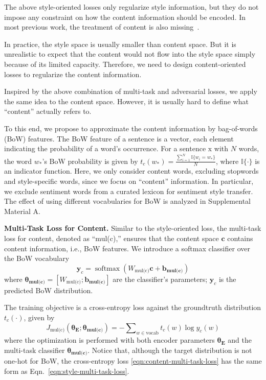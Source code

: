 \documentclass[11pt,a4paper]{article}
\newcommand{\rmx}{\mathrm x}
\newcommand{\loss}[1]{J_{\text{#1}}}
\newcommand{\nnweight}[1]{\bm{\theta_{\text{#1}}}}
\newcommand{\weight}[1]{W_{\text{#1}}}
\newcommand{\bias}[1]{\bm{b_{\text{#1}}}}
\begin{document}
The above style-oriented losses only regularize style information, but they do not impose any constraint on how the content information should be encoded. In most previous work, the treatment of content is also missing~\cite{hu2017toward,shen2017style,fu2018style}.

In practice, the style space is usually smaller than content space. But it is unrealistic to expect that the content would not flow into the style space simply because of its limited capacity. Therefore, we need to design content-oriented losses to regularize the content information.

Inspired by the above combination of multi-task and adversarial losses, we apply the same idea to the content space. However, it is usually hard to define what ``content'' actually refers to.

To this end, we propose to approximate the content information by bag-of-words (BoW) features.
The BoW feature of a sentence is a vector, each element indicating the probability of a word's occurrence.
For a sentence $\rmx$ with $N$ words, the word $w_*$'s BoW probability is given by
$t_c(w_*)=\frac{\sum_{i=1}^{N}{\mathbb{I}\{w_i = w_*\}}}{N}$,
where $\mathbb{I\{\cdot\}}$ is an indicator function.
Here, we only consider content words, excluding stopwords and style-specific words, since we focus on ``content'' information. In particular, we exclude sentiment words from a curated lexicon \cite{hu2004mining} for sentiment style transfer.
	{\color{red} The effect of using different vocabularies for BoW is analyzed in Supplemental Material A.}

\textbf{Multi-Task Loss for Content.} Similar to the style-oriented loss, the multi-task loss for content, denoted as ``mul(c),'' ensures that the content space $\bm c$ contains content information, i.e., BoW features.
We introduce a softmax classifier over the BoW vocabulary
\begin{equation} \label{eqn:bow-pred}
	\bm y_c = \operatorname{softmax}({\weight{mul(c)}} \bm c + \bias{mul(c)})
\end{equation}
where $\nnweight{mul(c)}\!\!=\!\![\weight{mul(c)}; \bias{mul(c)}]$ are the classifier's parameters; $\bm y_c$ is the predicted BoW distribution.

The training objective is a cross-entropy loss against the groundtruth distribution $t_c(\cdot)$, given by
\begin{equation}\label{eqn:content-multi-task-loss}
	\loss{mul(c)}(\nnweight{E};\nnweight{mul(c)}) = -\!\! \sum\nolimits_{w\in\text{vocab}}\!\! t_c(w)\log y_c(w)
\end{equation}
where the optimization is performed with both encoder parameters $\nnweight{E}$ and the multi-task classifier $\nnweight{mul(c)}$.
Notice that, although the target distribution is not one-hot  for BoW, the cross-entropy loss \ref{eqn:content-multi-task-loss} has the same form as Eqn.~\ref{eqn:style-multi-task-loss}.
\end{document}
